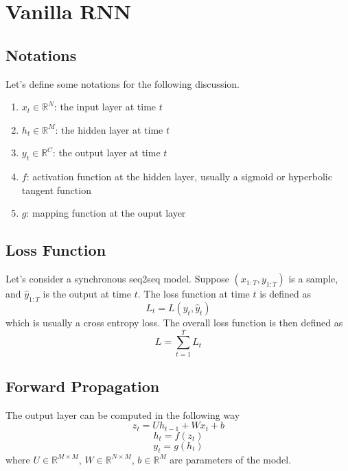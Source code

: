 \documentclass[11pt,a4paper]{article}
\begin{document}
\section{Vanilla RNN}
\subsection{Notations}
Let's define some notations for the following discussion.
\begin{enumerate}
\item $x_{t} \in \mathbb{R}^{N}$: the input layer at time $t$
\item $h_{t} \in \mathbb{R}^{M}$: the hidden layer at time $t$
\item $y_{t} \in \mathbb{R}^{C}$: the output layer at time $t$
\item $f$: activation function at the hidden layer, usually a sigmoid or hyperbolic tangent function
\item $g$: mapping function at the ouput layer
\end{enumerate}
\subsection{Loss Function}
Let's consider a synchronous seq2seq model. Suppose $(x_{1:T},y_{1:T})$ is a sample, and $\hat{y}_{1:T}$ is the output at time $t$. The loss function at time $t$ is defined as
\begin{displaymath}
L_{t} = L(y_{t},\hat{y}_{t})
\end{displaymath}
which is usually a cross entropy loss. The overall loss function is then defined as
\begin{displaymath}
L = \sum^{T}_{t = 1} L_{t}
\end{displaymath}
\subsection{Forward Propagation}
The output layer can be computed in the following way
\begin{displaymath}
z_{t} = Uh_{t-1} + Wx_{t} + b
\end{displaymath}
\begin{displaymath}
h_{t} = f(z_{t})
\end{displaymath}
\begin{displaymath}
y_{t} = g(h_{t})
\end{displaymath}
where $U \in \mathbb{R}^{M \times M}$, $W \in \mathbb{R}^{N \times M}$, $b \in \mathbb{R}^{M}$ are parameters of the model.
\end{document}
